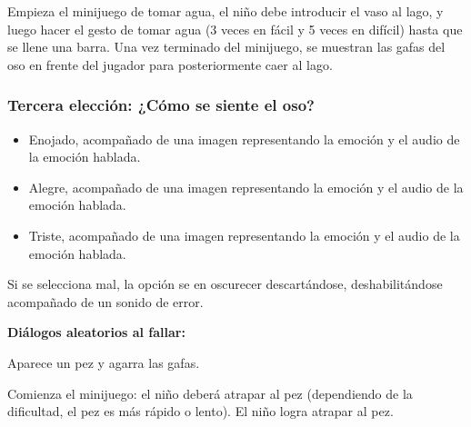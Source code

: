 \begin{play}
\begin{stage}
Empieza el minijuego de tomar agua, el niño debe introducir el vaso al lago, y luego hacer el gesto de tomar agua (3 veces en fácil y 5 veces en difícil) hasta que se llene una barra.  
Una vez terminado del minijuego, se muestran las gafas del oso en frente del jugador para posteriormente caer al lago.
\end{stage}


\subsubsection*{Tercera elección: ¿Cómo se siente el oso?}


\begin{itemize}
  \item Enojado, acompañado de una imagen representando la emoción y el audio de la emoción hablada. 
  \item Alegre, acompañado de una imagen representando la emoción y el audio de la emoción hablada.
  \item Triste, acompañado de una imagen representando la emoción y el audio de la emoción hablada.
\end{itemize}

\begin{stage}
Si se selecciona mal, la opción se en oscurecer descartándose, deshabilitándose acompañado de un sonido de error.
\end{stage}

\textbf{Diálogos aleatorios al fallar:}


\begin{stage}
Aparece un pez y agarra las gafas.
\end{stage}



\begin{stage}
Comienza el minijuego: el niño deberá atrapar al pez (dependiendo de la dificultad, el pez es más rápido o lento).
El niño logra atrapar al pez.
\end{stage}


\end{play}
